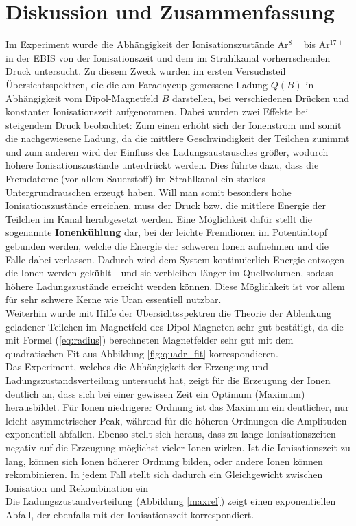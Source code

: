 \section{Diskussion und Zusammenfassung}
	Im Experiment wurde die Abhängigkeit der Ionisationszustände Ar$^{8+}$ bis Ar$^{17+}$ in der EBIS von der Ionisationszeit und dem im Strahlkanal vorherrschenden Druck untersucht. Zu diesem Zweck wurden im ersten Versuchsteil Übersichtsspektren, die die am Faradaycup gemessene Ladung $Q(B)$ in Abhängigkeit vom Dipol-Magnetfeld $B$ darstellen, bei verschiedenen Drücken und konstanter Ionisationszeit aufgenommen. Dabei wurden zwei Effekte bei steigendem Druck beobachtet: Zum einen erhöht sich der Ionenstrom und somit die nachgewiesene Ladung, da die mittlere Geschwindigkeit der Teilchen zunimmt und zum anderen wird der Einfluss des Ladungsaustausches größer, wodurch höhere Ionisationszustände unterdrückt werden. Dies führte dazu, dass die Fremdatome (vor allem Sauerstoff) im Strahlkanal ein starkes Untergrundrauschen erzeugt haben. Will man somit besonders hohe Ionisationszustände erreichen, muss der Druck bzw. die mittlere Energie der Teilchen im Kanal herabgesetzt werden. Eine Möglichkeit dafür stellt die sogenannte \textbf{Ionenkühlung} dar, bei der leichte Fremdionen im Potentialtopf gebunden werden, welche die Energie der schweren Ionen aufnehmen und die Falle dabei verlassen. Dadurch wird dem System kontinuierlich Energie entzogen - die Ionen werden gekühlt - und sie verbleiben länger im Quellvolumen, sodass höhere Ladungszustände erreicht werden können. Diese Möglichkeit ist vor allem für sehr schwere Kerne wie Uran essentiell nutzbar. \cite{PA}\\
	Weiterhin wurde mit Hilfe der Übersichtsspektren die Theorie der Ablenkung geladener Teilchen im Magnetfeld des Dipol-Magneten sehr gut bestätigt, da die mit Formel (\ref{eq:radius}) berechneten Magnetfelder sehr gut mit dem quadratischen Fit aus Abbildung \ref{fig:quadr_fit} korrespondieren.\\
	Das Experiment, welches die Abhängigkeit der Erzeugung und Ladungszustandsverteilung untersucht hat, zeigt für die Erzeugung der Ionen deutlich an, dass sich bei einer gewissen Zeit ein Optimum (Maximum) herausbildet. Für Ionen niedrigerer Ordnung ist das Maximum ein deutlicher, nur leicht asymmetrischer Peak, während für die höheren Ordnungen die Amplituden exponentiell abfallen. Ebenso stellt sich heraus, dass zu lange Ionisationszeiten negativ auf die Erzeugung möglichst vieler Ionen wirken. Ist die Ionisationszeit zu lang, können sich Ionen höherer Ordnung bilden, oder andere Ionen können rekombinieren. In jedem Fall stellt sich dadurch ein Gleichgewicht zwischen Ionisation und Rekombination ein\\
    Die Ladungszustandverteilung (Abbildung \ref{maxrel}) zeigt einen exponentiellen Abfall, der ebenfalls mit der Ionisationszeit korrespondiert. 
